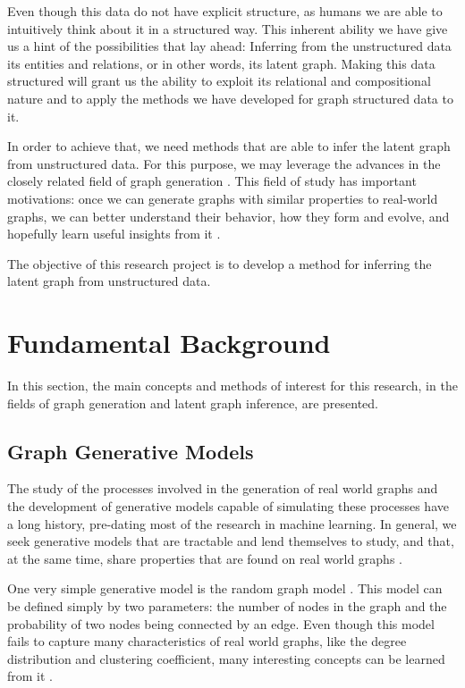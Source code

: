 \documentclass[12pt,a4paper]{article}
\begin{document}
	Even though this data do not have explicit structure, as humans we are able to intuitively think about it in a structured way. This inherent ability we have give us a hint of the possibilities that lay ahead: Inferring from the unstructured data its entities and relations, or in other words, its latent graph. Making this data structured will grant us the ability to exploit its relational and compositional nature and to apply the methods we have developed for graph structured data to it.

	In order to achieve that, we need methods that are able to infer the latent graph from unstructured data. For this purpose, we may leverage the advances in the closely related field of graph generation \citep{ErdösandRényi1960, AlbertandBarabási2002, KipfandWelling2016, Li2018}. This field of study has important motivations: once we can generate graphs with similar properties to real-world graphs, we can better understand their behavior, how they form and evolve, and hopefully learn useful insights from it \citep{Hamilton2020}.

	The objective of this research project is to develop a method for inferring the latent graph from unstructured data.

	\section{Fundamental Background}
	\label{sec:background}

	In this section, the main concepts and methods of interest for this research, in the fields of graph generation and latent graph inference, are presented.

	\subsection{Graph Generative Models}
	\label{sec:graph_generative_models}

	The study of the processes involved in the generation of real world graphs and the development of generative models capable of simulating these processes have a long history, pre-dating most of the research in machine learning. In general, we seek generative models that are tractable and lend themselves to study, and that, at the same time, share properties that are found on real world graphs \citep{Hamilton2020}.

	One very simple generative model is the random graph model \citep{ErdösandRényi1960}. This model can be defined simply by two parameters: the number of nodes in the graph and the probability of two nodes being connected by an edge. Even though this model fails to capture many characteristics of real world graphs, like the degree distribution and clustering coefficient, many interesting concepts can be learned from it \citep{Newman2019}.
\end{document}
